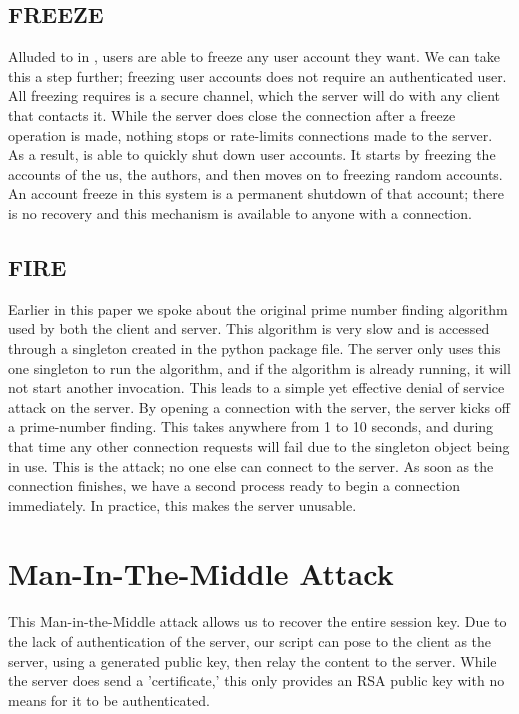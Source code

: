 \documentclass{article}
\newcommand{\code}[1]{\tcbox[
    on line,
    colback=codebackground, boxsep=2pt,
    colframe=white, boxrule=0pt,
    top=0pt, bottom=0pt, left=0pt, right=0pt
]{\texttt{#1}}}
\begin{document}
\subsection{FREEZE}
Alluded to in \code{FRAUDCLIENT}, users are able to freeze any user account they want. We can take this a step further; freezing user accounts does not require an authenticated user. All freezing requires is a secure channel, which the server will do with any client that contacts it. While the server does close the connection after a freeze operation is made, nothing stops or rate-limits connections made to the server.
As a result, \code{FREEZE} is able to quickly shut down user accounts. It starts by freezing the accounts of the us, the authors, and then moves on to freezing random accounts. An account freeze in this system is a permanent shutdown of that account; there is no recovery and this mechanism is available to anyone with a connection.

\subsection{FIRE}
Earlier in this paper we spoke about the original prime number finding algorithm used by both the client and server. This algorithm is very slow and is accessed through a singleton created in the python package file. The server only uses this one singleton to run the algorithm, and if the algorithm is already running, it will not start another invocation. This leads to a simple yet effective denial of service attack on the server.
By opening a connection with the server, the server kicks off a prime-number finding. This takes anywhere from 1 to 10 seconds, and during that time any other connection requests will fail due to the singleton object being in use.
This is the attack; no one else can connect to the server. As soon as the connection finishes, we have a second process ready to begin a connection immediately. In practice, this makes the server unusable.

\section{Man-In-The-Middle Attack}
This Man-in-the-Middle attack allows us to recover the entire session key.
Due to the lack of authentication of the server, our script can pose to the client as the server,
using a generated public key, then relay the content to the server.
While the server does send a 'certificate,' this only provides an RSA public key with no means for it to be authenticated.
\end{document}
